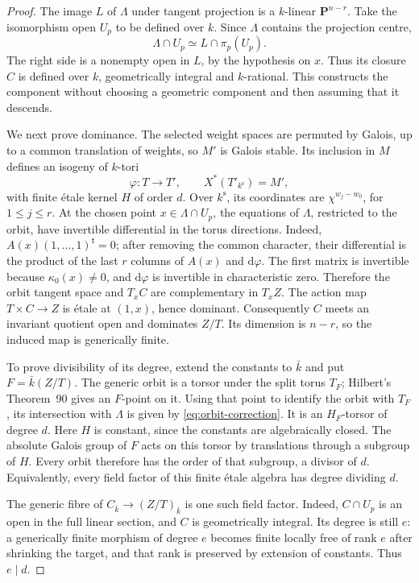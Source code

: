 \documentclass[11pt]{article}
\theoremstyle{remark}
\newcommand{\PP}{\mathbf P}
\newcommand{\ks}{k^{\mathrm s}}
\begin{document}
\begin{proof}
The image \(L\) of \(\Lambda\) under tangent projection is a
\(k\)-linear \(\PP^{n-r}\).  Take the isomorphism open \(U_p\) to be
defined over \(k\).  Since \(\Lambda\) contains the projection centre,
\[
 \Lambda\cap U_p\simeq L\cap\pi_p(U_p).
\]
The right side is a nonempty open in \(L\), by the hypothesis on \(x\).
Thus its closure \(C\) is defined over \(k\), geometrically integral and
\(k\)-rational.  This constructs the component without choosing a
geometric component and then assuming that it descends.

We next prove dominance.  The selected weight spaces are permuted by
Galois, up to a common translation of weights, so \(M'\) is Galois stable.
Its inclusion in \(M\) defines an isogeny of \(k\)-tori
\[
 \varphi:T\longrightarrow T',\qquad X^*(T'_{\ks})=M',
\]
with finite \'etale kernel \(H\) of order \(d\).  Over \(\ks\), its
coordinates are \(\chi^{w_j-w_0}\), for \(1\leq j\leq r\).
At the chosen point \(x\in\Lambda\cap U_p\), the equations of
\(\Lambda\), restricted to the orbit, have invertible differential in
the torus directions.  Indeed, \(A(x)(1,\ldots,1)^{\mathsf t}=0\);
after removing the common character, their differential is the product
of the last \(r\) columns of \(A(x)\) and \(\mathrm d\varphi\).
The first matrix is invertible because \(\kappa_0(x)\ne0\), and
\(\mathrm d\varphi\) is invertible in characteristic zero.  Therefore the
orbit tangent space and \(T_xC\) are complementary in \(T_xZ\).
The action map \(T\times C\to Z\) is \'etale at \((1,x)\), hence
dominant.  Consequently \(C\) meets an invariant quotient open and
dominates \(Z/T\).  Its dimension is \(n-r\), so the induced map is
generically finite.

To prove divisibility of its degree, extend the constants to \(\bar k\)
and put \(F=\bar k(Z/T)\).  The generic orbit is a torsor under the
split torus \(T_F\); Hilbert's Theorem~90 gives an \(F\)-point on it.
Using that point to identify the orbit with \(T_F\), its intersection
with \(\Lambda\) is given by \eqref{eq:orbit-correction}.  It is an
\(H_F\)-torsor of degree \(d\).  Here \(H\) is constant, since the
constants are algebraically closed.  The absolute Galois group of \(F\)
acts on this torsor by translations through a subgroup of \(H\).
Every orbit therefore has the order of that subgroup, a divisor of \(d\).
Equivalently, every field factor of this finite \'etale algebra has degree
dividing \(d\).

The generic fibre of \(C_{\bar k}\to(Z/T)_{\bar k}\) is one such field
factor.  Indeed, \(C\cap U_p\) is an open in the full linear section,
and \(C\) is geometrically integral.  Its degree is still \(e\): a
generically finite morphism of degree \(e\) becomes finite locally free
of rank \(e\) after shrinking the target, and that rank is preserved
by extension of constants.  Thus \(e\mid d\).
\end{proof}
\end{document}
